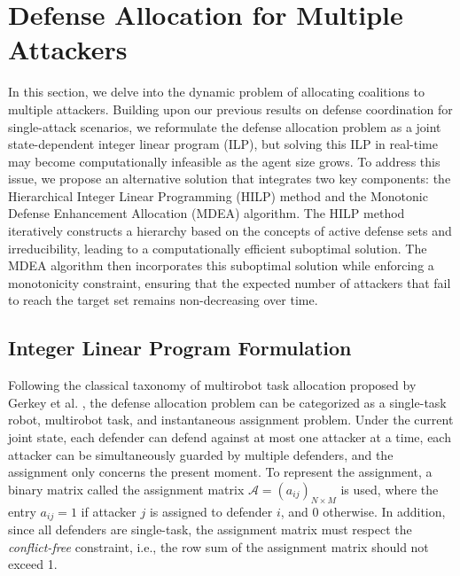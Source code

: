 \documentclass[journal]{IEEEtran}
\newcommand{\1}{\mathbf{1}}
\newcommand{\A}{\mathcal{A}}
\begin{document}
\section{Defense Allocation for Multiple Attackers}\label{sec:4}

In this section, we delve into the dynamic problem of allocating coalitions to multiple attackers. Building upon our previous results on defense coordination for single-attack scenarios, we reformulate the defense allocation problem as a joint state-dependent integer linear program (ILP), but solving this ILP in real-time may become computationally infeasible as the agent size grows. To address this issue, we propose an alternative solution that integrates two key components: the Hierarchical Integer Linear Programming (HILP) method and the Monotonic Defense Enhancement Allocation (MDEA) algorithm. The HILP method iteratively constructs a hierarchy based on the concepts of active defense sets and irreducibility, leading to a computationally efficient suboptimal solution. The MDEA algorithm then incorporates this suboptimal solution while enforcing a monotonicity constraint, ensuring that the expected number of attackers that fail to reach the target set remains non-decreasing over time.

\subsection{Integer Linear Program Formulation}

Following the classical taxonomy of multirobot task allocation proposed by Gerkey et al. \cite{gerkey2004formal}, the defense allocation problem can be categorized as a single-task robot, multirobot task, and instantaneous assignment problem. Under the current joint state, each defender can defend against at most one attacker at a time, each attacker can be simultaneously guarded by multiple defenders, and the assignment only concerns the present moment. To represent the assignment, a binary matrix called the assignment matrix $\A=(a_{ij})_{N\times M}$ is used, where the entry $a_{ij}=1$ if attacker $j$ is assigned to defender $i$, and 0 otherwise. In addition, since all defenders are single-task, the assignment matrix must respect the \textit{conflict-free} constraint, i.e., the row sum of the assignment matrix should not exceed 1.
\end{document}
